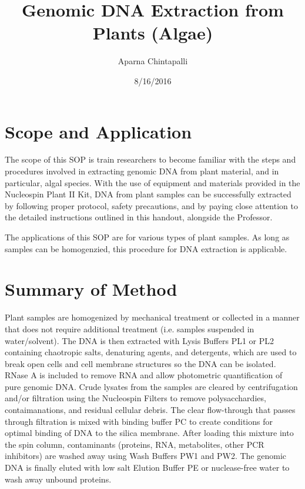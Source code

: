 \documentclass[12pt]{../SOP3_alpha}
\title{Genomic DNA Extraction from Plants (Algae)}
\date{8/16/2016}
\author{Aparna Chintapalli}
\begin{document}


\maketitle

\section{Scope and Application}

\NP The scope of this SOP is train researchers to become familiar with the steps and procedures involved in extracting genomic DNA from plant material, and in particular, algal species. With the use of equipment and materials provided in the Nucleospin Plant II Kit, DNA from plant samples can be successfully extracted by following proper protocol, safety precautions, and by paying close attention to the detailed instructions outlined in this handout, alongside the Professor. 

\NP The applications of this SOP are for various types of plant samples. As long as samples can be homogenzied, this procedure for DNA extraction is applicable. 

\section{Summary of Method}

\NP Plant samples are homogenized by mechanical treatment or collected in a manner that does not require additional treatment (i.e. samples suspended in water/solvent). The DNA is then extracted with Lysis Buffers PL1 or PL2 containing chaotropic salts, denaturing agents, and detergents, which are used to break open cells and cell membrane structures so the DNA can be isolated. RNase A is included to remove RNA and allow photometric quantification of pure genomic DNA. Crude lysates from the samples are cleared by centrifugation and/or filtration using the Nucleospin Filters to remove polysacchardies, contaimanations, and residual cellular debris. The clear flow-through that passes through filtration is mixed with binding buffer PC to create conditions for optimal binding of DNA to the silica membrane. After loading this mixture into the spin column, contaminants (proteins, RNA, metabolites, other PCR inhibitors) are washed away using Wash Buffers PW1 and PW2. The genomic DNA is finally eluted with low salt Elution Buffer PE or nuclease-free water to wash away unbound proteins.
\end{document}
